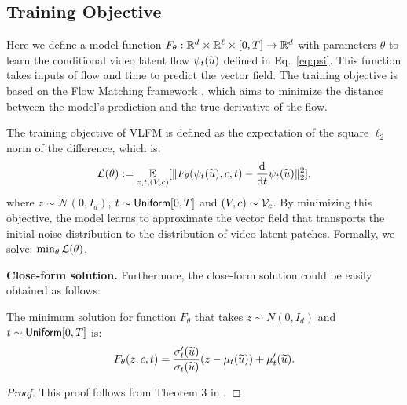 \subsection{Training Objective}\label{sub:training_objective}

Here we define a model function $F_\theta: \mathbb{R}^d \times \mathbb{R}^\ell \times [0, T] \rightarrow \mathbb{R}^d$ with parameters $\theta$ to learn the conditional video latent flow $\psi_t(\widetilde{u})$ defined in Eq.~\eqref{eq:psi}. This function takes inputs of flow and time to predict the vector field. The training objective is based on the Flow Matching framework \cite{lcb+22}, which aims to minimize the distance between the model's prediction and the true derivative of the flow.

The training objective of VLFM is defined as the expectation of the square $\ell_2$ norm of the difference, which is:
\begin{align*}
    {\cal L}(\theta) := \operatorname*{{\mathbb{E}}}_{z, t, (V, c)}[\| F_\theta( \psi_t(\widetilde{u}), c, t ) - \frac{\mathrm{d} }{\mathrm{d} t} \psi_t(\widetilde{u}) \|_2^2],
\end{align*}
where $z \sim \mathcal{N}(0, I_d)$,  $t \sim {\sf Uniform}[0, T]$ and $(V, c) \sim {\cal V}_c$. By minimizing this objective, the model learns to approximate the vector field that transports the initial noise distribution to the distribution of video latent patches. Formally, we solve: $\min_{\theta} {\cal L}(\theta)$. 

{\bf Close-form solution.} Furthermore, the close-form solution could be easily obtained as follows:
\begin{theorem}
    The minimum solution for function $F_\theta$ that takes $z \sim N(0, I_d)$ and $t \sim {\sf Uniform}[0, T]$ is:
    \begin{align*}
        F_\theta(z, c, t) = \frac{\sigma_t'(\widetilde{u})}{\sigma_t(\widetilde{u})} (z - \mu_t(\widetilde{u})) + \mu_t'(\widetilde{u}).
    \end{align*}
\end{theorem}

\begin{proof}
    This proof follows from Theorem 3 in \cite{lcb+22}.
\end{proof}

